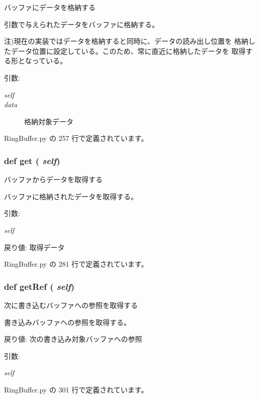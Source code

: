 バッファにデータを格納する 

引数で与えられたデータをバッファに格納する。

注)現在の実装ではデータを格納すると同時に、データの読み出し位置を 格納したデータ位置に設定している。このため、常に直近に格納したデータを 取得する形となっている。

\begin{Desc}
\item[引数:]
\begin{description}
\item[{\em self}]\item[{\em data}]格納対象データ \end{description}
\end{Desc}


 RingBuffer.py の 257 行で定義されています。
\subsubsection{\setlength{\rightskip}{0pt plus 5cm}def get ( {\em self})}\label{classsource__py_1_1_ring_buffer_1_1_ring_buffer_444a1328efb32d5d9d2dcb2efe855d3b}


バッファからデータを取得する 

バッファに格納されたデータを取得する。

\begin{Desc}
\item[引数:]
\begin{description}
\item[{\em self}]\end{description}
\end{Desc}
\begin{Desc}
\item[戻り値:]取得データ \end{Desc}


 RingBuffer.py の 281 行で定義されています。
\subsubsection{\setlength{\rightskip}{0pt plus 5cm}def getRef ( {\em self})}\label{classsource__py_1_1_ring_buffer_1_1_ring_buffer_e1daf7a4fa2db844dc84df9a9bbf113c}


次に書き込むバッファへの参照を取得する 

書き込みバッファへの参照を取得する。

\begin{Desc}
\item[戻り値:]次の書き込み対象バッファへの参照\end{Desc}
\begin{Desc}
\item[引数:]
\begin{description}
\item[{\em self}]\end{description}
\end{Desc}


 RingBuffer.py の 301 行で定義されています。